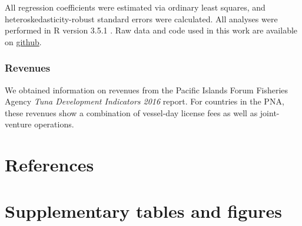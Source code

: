 \documentclass[9p,twocolumn,twoside,lineno]{pnas-new}
\begin{document}
\begin{scriptsize}
All regression coefficients were estimated via ordinary least squares, and heteroskedasticity-robust standard errors were calculated. All analyses were performed in R version 3.5.1 \citep{rcore_2018}. Raw data and code used in this work are available on \href{https://github.com/jcvdav/MPA_displacement}{github}.

\subsubsection{Revenues}

We obtained information on revenues from the Pacific Islands Forum Fisheries Agency \emph{Tuna Development Indicators 2016} report. For countries in the PNA, these revenues show a combination of vessel-day license fees as well as joint-venture operations.

\end{scriptsize}

\section{References}




\clearpage

\onecolumn

\FloatBarrier

\newcommand{\beginsupplement}{\setcounter{table}{0}  \renewcommand{\thetable}{S\arabic{table}} \setcounter{figure}{0} \renewcommand{\thefigure}{S\arabic{figure}}}

\setcounter{table}{0}  \renewcommand{\thetable}{S\arabic{table}} \setcounter{figure}{0} \renewcommand{\thefigure}{S\arabic{figure}}

\section{Supplementary tables and figures}
\end{document}
